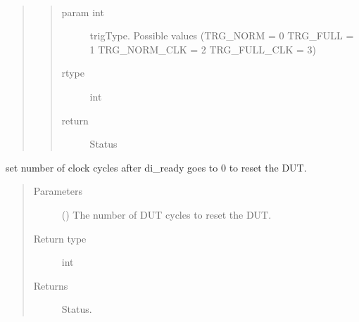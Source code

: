 \documentclass[letterpaper,10pt,english]{sphinxmanual}
\begin{document}
\begin{fulllineitems}
\begin{fulllineitems}
\begin{quote}
\begin{description}
\end{description}\end{quote}

\end{fulllineitems}


\begin{fulllineitems}
\label{\detokenize{reference_doc:fobos.Basys3Ctrl.setTriggerMode}}~\begin{quote}
\begin{quote}\begin{description}
\item[{param int}] \leavevmode
trigType. Possible values (TRG\_NORM = 0 \textbar{} TRG\_FULL = 1 \textbar{} TRG\_NORM\_CLK = 2 \textbar{} TRG\_FULL\_CLK = 3)

\item[{rtype}] \leavevmode
int

\item[{return}] \leavevmode
Status

\end{description}\end{quote}
\end{quote}

\begin{fulllineitems}
\label{\detokenize{reference_doc:fobos.Basys3Ctrl.setTimeToReset}}
set number of clock cycles after di\_ready goes to 0 to reset the DUT.
\begin{quote}\begin{description}
\item[{Parameters}] \leavevmode
{} () \textendash{} The number of DUT cycles to reset the DUT.

\item[{Return type}] \leavevmode
int

\item[{Returns}] \leavevmode
Status.

\end{description}\end{quote}


\end{fulllineitems}
\end{fulllineitems}
\end{fulllineitems}
\end{document}
